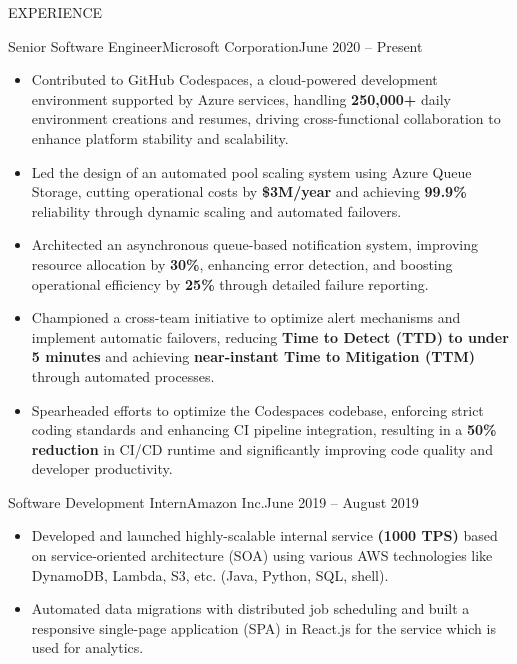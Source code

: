 \documentclass[]{mcdowellcv}
\begin{document}
	\makeheader
	
	\begin{cvsection}{EXPERIENCE}
	    \begin{cvsubsection}{Senior Software Engineer}{Microsoft Corporation}{June 2020 -- Present}
			\begin{itemize}
				\item Contributed to GitHub Codespaces, a cloud-powered development environment supported by Azure services, handling \textbf{250,000+} daily environment creations and resumes, driving cross-functional collaboration to enhance platform stability and scalability.
                    \item Led the design of an automated pool scaling system using Azure Queue Storage, cutting operational costs by \textbf{\$3M/year} and achieving \textbf{99.9\%} reliability through dynamic scaling and automated failovers.
                    \item Architected an asynchronous queue-based notification system, improving resource allocation by \textbf{30\%}, enhancing error detection, and boosting operational efficiency by \textbf{25\%} through detailed failure reporting.
                    \item Championed a cross-team initiative to optimize alert mechanisms and implement automatic failovers, reducing \textbf{Time to Detect (TTD) to under 5 minutes} and achieving \textbf{near-instant Time to Mitigation (TTM)} through automated processes.
                    \item Spearheaded efforts to optimize the Codespaces codebase, enforcing strict coding standards and enhancing CI pipeline integration, resulting in a \textbf{50\% reduction} in CI/CD runtime and significantly improving code quality and developer productivity.
			\end{itemize}
   
		\end{cvsubsection}
		
	    \begin{cvsubsection}{Software Development Intern}{Amazon Inc.}{June 2019 -- August 2019}
			\begin{itemize}
				\item Developed and launched highly-scalable internal service \textbf{(1000 TPS)} based on service-oriented architecture (SOA) using various AWS technologies like DynamoDB, Lambda, S3, etc. (Java, Python, SQL, shell).
				\item Automated data migrations with distributed job scheduling and built a responsive single-page application (SPA) in React.js for the service which is used for analytics.
			\end{itemize}
		\end{cvsubsection}
		

\end{cvsection}
\end{document}
